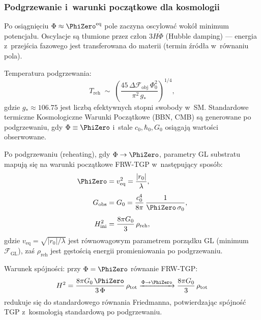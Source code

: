 \subsubsection{Podgrzewanie i~warunki pocz\k{a}tkowe dla kosmologii}

Po osi\k{a}gni\k{e}ciu $\Phi \approx \PhiZero^{\mathrm{eq}}$
pole zaczyna oscylowa\'c wok\'o\l{} minimum potencja\l{}u.
Oscylacje s\k{a} t\l{}umione przez cz\l{}on $3H\dot\Phi$
(Hubble damping) --- energia z~przej\'scia fazowego
jest transferowana do materii (termin \'zr\'od\l{}a
w~r\'ownaniu pola).

\begin{proposition}\label{prop:reheating}
Temperatura podgrzewania:
\begin{equation}\label{eq:T-reheat}
    T_\mathrm{reh}
    \;\sim\; \left(\frac{45\,\Delta\mathcal{F}_\mathrm{obj}\,\Phi_0^2}
                        {\pi^2\,g_*}\right)^{1/4},
\end{equation}
gdzie $g_* \approx 106.75$ jest liczb\k{a} efektywnych
stopni swobody w~SM.
Standardowe termiczne Kosmologiczne Warunki Pocz\k{a}tkowe
(BBN, CMB) s\k{a} generowane po podgrzewaniu,
gdy $\Phi \equiv \PhiZero$ i~stale $c_0, \hbar_0, G_0$ osi\k{a}gaj\k{a}
warto\'sci obserwowane.
\end{proposition}

\begin{proposition}\label{prop:GL-FRW-bridge}
Po podgrzewaniu (reheating), gdy $\Phi \to \PhiZero$,
parametry GL substratu mapuj\k{a} si\k{e} na warunki
pocz\k{a}tkowe FRW-TGP w~nast\k{e}puj\k{a}cy spos\'ob:
\begin{align}
    \PhiZero &= v_{\mathrm{eq}}^2
    = \frac{|r_0|}{\lambda},
    \label{eq:Phi0-from-veq}\\[4pt]
    G_{\mathrm{obs}} &= G_0
    = \frac{c_0^4}{8\pi}\,\frac{1}{\PhiZero\,\sigma_0},
    \label{eq:G-from-Phi0}\\[4pt]
    H_{\mathrm{ini}}^2 &= \frac{8\pi G_0}{3}\,\rho_{\mathrm{reh}},
    \label{eq:H-ini-FRW}
\end{align}
gdzie $v_{\mathrm{eq}} = \sqrt{|r_0|/\lambda}$ jest
r\'ownowagowym parametrem porz\k{a}dku GL (minimum
$\mathcal{F}_{\mathrm{GL}}$), za\'s $\rho_{\mathrm{reh}}$
jest g\k{e}sto\'sci\k{a} energii promieniowania po podgrzewaniu.

Warunek spójności: przy $\Phi = \PhiZero$ r\'ownanie FRW-TGP:
\begin{equation}\label{eq:FRW-TGP-ini}
    H^2 = \frac{8\pi G_0\,\PhiZero}{3\,\Phi}\,\rho_{\mathrm{tot}}
    \xrightarrow{\Phi \to \PhiZero}
    \frac{8\pi G_0}{3}\,\rho_{\mathrm{tot}}
\end{equation}
redukuje si\k{e} do standardowego r\'ownania Friedmanna,
potwierdzaj\k{a}c sp\'ojno\'s\'c TGP z~kosmologi\k{a} standardow\k{a}
po podgrzewaniu.
\end{proposition}

